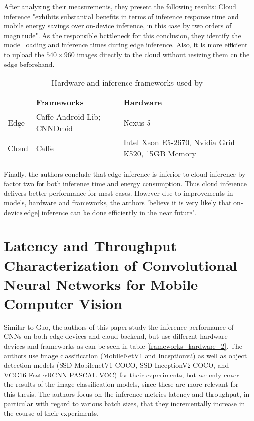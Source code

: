 After analyzing their measurements, they present the following results:
Cloud inference "exhibits substantial benefits
in terms of inference response time and mobile energy savings
over on-device inference, in this case by two orders of magnitude". As the responsible bottleneck for this conclusion, they identify the model loading and inference times during edge inference.
Also, it is more efficient to upload the $540\times960$ images directly to the cloud without resizing them on the edge beforehand.


\begin{table}[H]
\centering
\caption{Hardware and inference frameworks used by \cite{DBLP:conf/ic2e/Guo18}}
\begin{tabular}{@{}lll@{}}
\toprule
 & Frameworks & Hardware \\
 \midrule
Edge & Caffe Android Lib; CNNDroid & Nexus 5 \\
Cloud & Caffe & Intel Xeon E5-2670, Nvidia Grid K520, 15GB Memory\\
\bottomrule

\end{tabular}

\label{frameworks_hardware_1}
\end{table}

Finally, the authors conclude that edge inference is inferior to cloud inference by factor two for both inference time and energy consumption. Thus cloud inference delivers better performance for most cases. However due to improvements in models, hardware and frameworks, the authors "believe it is
very likely that on-device[edge] inference can be done efficiently in the near future". 
\section{Latency and Throughput Characterization of Convolutional
Neural Networks for Mobile Computer Vision}
Similar to Guo, the authors of this paper study the inference performance of CNNs on both edge devices and cloud backend, but use different hardware devices and frameworks as can be seen in table \ref{frameworks_hardware_2}. 
The authors use image classification (MobileNetV1 and Inceptionv2) as well as object detection models (SSD MobilenetV1 COCO, SSD InceptionV2 COCO,
and VGG16 FasterRCNN PASCAL VOC) for their experiments, but we only cover the results of the image classification models, since these are more relevant for this thesis.
The authors focus on the inference metrics latency and throughput, in particular with regard to various batch sizes, that they incrementally increase in the course of their experiments.

